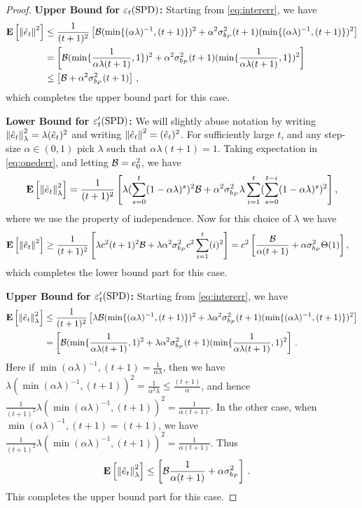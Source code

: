 \begin{proof}
\textbf{Upper Bound for $\varepsilon_t(\mathrm{SPD})$:}
Starting from \eqref{eq:intererr}, we have
\begin{align}
\mathbf{E}\left[\left\| \hat{e}_t\right\|^2\right]
&\leq \frac{1}{(t+1)^2}\left[\mathcal{B} (\min\{(\alpha\lambda)^{-1},(t+1)\})^2+ \alpha^2 \sigma^2_{b_P} (t+1) (\min\{(\alpha\lambda)^{-1},(t+1)\})^2 \right]\\
&= \left[\mathcal{B} (\min\{\frac{1}{\alpha \lambda (t+1)},1\})^2
		+ \alpha^2 \sigma^2_{b_P} (t+1) (\min\{\frac{1}{\alpha \lambda (t+1)},1\})^2 \right]\\
&\leq \left[\mathcal{B} + \alpha^2 \sigma^2_{b_P} (t+1) \right]\,, 
\end{align}
which completes the upper bound part for this case.

\textbf{Lower Bound for $\varepsilon_t'(\mathrm{SPD})$:}
We will slightly abuse notation by writing $\left\| \hat{e}_t\right\|^2_{\lambda} = \lambda (\hat{e}_t)^2$
and writing $\left\| \hat{e}_t\right\|^2 = (\hat{e}_t)^2$.
For sufficiently large $t$, and any step-size $\alpha \in (0,1)$ pick $\lambda$ such that $\alpha \lambda (t+1)=1$. Taking expectation in \eqref{eq:onederr}, and letting $\mathcal{B}=e_0^2$, we have
\begin{align}\label{eq:intererr}
\mathbf{E}\left[\left\| \hat{e}_t\right\|^2_{\lambda}\right]=\frac{1}{(t+1)^2}\left[ \lambda (\sum_{s=0}^t(1-\alpha \lambda)^s)^2 \mathcal{B}+ \alpha^2\sigma^2_{b_P}\lambda \sum_{i=1}^t (\sum_{s=0}^{t-i} (1-\alpha \lambda)^s)^2\right],
\end{align}
where we use the property of independence. Now for this choice of $\lambda$ we have
\begin{align}
\mathbf{E}\left[\left\| \hat{e}_t\right\|^2\right]&\geq \frac{1}{(t+1)^2}\left[ \lambda c^2(t+1)^2 \mathcal{B}+ \lambda \alpha^2\sigma^2_{b_P} c^2\sum_{i=1}^t (i)^2\right]
= c^2\left[\frac{\mathcal{B}}{\alpha (t+1)}+ \alpha  \sigma^2_{b_P} \Theta(1) \right],
\end{align}
which completes the lower bound part for this case.

\textbf{Upper Bound for $\varepsilon_t'(\mathrm{SPD})$:}
Starting from \eqref{eq:intererr}, we have
\begin{align}
\mathbf{E}\left[\left\| \hat{e}_t\right\|^2_{\lambda}\right]&\leq \frac{1}{(t+1)^2}\left[\lambda \mathcal{B} (\min\{(\alpha\lambda)^{-1},(t+1)\})^2+ \lambda \alpha^2 \sigma^2_{b_P} (t+1) (\min\{(\alpha\lambda)^{-1},(t+1)\})^2 \right]\\
&= \left[\mathcal{B} (\min\{\frac{1}{\alpha \lambda (t+1)},1)^2+ \lambda \alpha^2 \sigma^2_{b_P} (t+1) (\min\{\frac{1}{\alpha \lambda (t+1)},1)^2 \right]\,.
\end{align}
Here if $\min{(\alpha\lambda)^{-1},(t+1)}=\frac{1}{\alpha \lambda}$, then we have $\lambda(\min{(\alpha\lambda)^{-1},(t+1)})^2=\frac{1}{\alpha^2 \lambda}\leq \frac{(t+1)}{\alpha}$, and hence $\frac{1}{(t+1)^2}\lambda(\min{(\alpha\lambda)^{-1},(t+1)})^2=\frac{1}{\alpha (t+1)}$. In the other case, when $\min{(\alpha\lambda)^{-1},(t+1)}=(t+1)$, we have
$\frac{1}{(t+1)^2}\lambda(\min{(\alpha\lambda)^{-1},(t+1)})^2=\frac{1}{\alpha (t+1)}$. Thus
\begin{align}
\mathbf{E}\left[\left\| \hat{e}_t\right\|^2_{\lambda}\right]&\leq \left[\mathcal{B} \frac{1}{\alpha (t+1)}+ \alpha \sigma^2_{b_P} \right]\,.
\end{align}
This completes the upper bound part for this case.


\end{proof}
